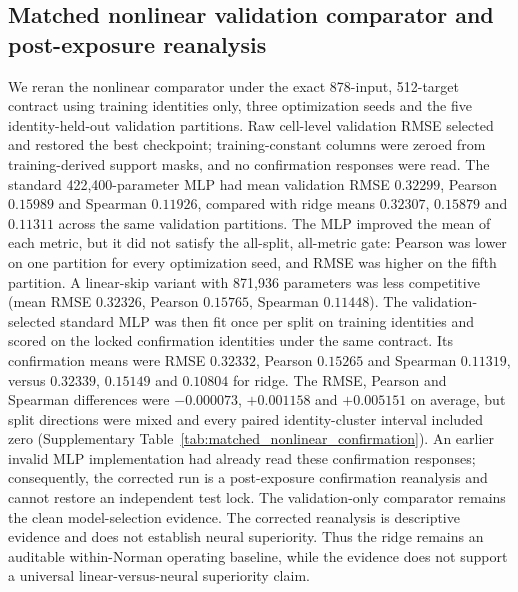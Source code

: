 \documentclass[10pt]{article}
\begin{document}



\subsection{Matched nonlinear validation comparator and post-exposure reanalysis}
We reran the nonlinear comparator under the exact 878-input, 512-target contract using training identities only, three optimization seeds and the five identity-held-out validation partitions. Raw cell-level validation RMSE selected and restored the best checkpoint; training-constant columns were zeroed from training-derived support masks, and no confirmation responses were read. The standard 422,400-parameter MLP had mean validation RMSE $0.32299$, Pearson $0.15989$ and Spearman $0.11926$, compared with ridge means $0.32307$, $0.15879$ and $0.11311$ across the same validation partitions. The MLP improved the mean of each metric, but it did not satisfy the all-split, all-metric gate: Pearson was lower on one partition for every optimization seed, and RMSE was higher on the fifth partition. A linear-skip variant with 871,936 parameters was less competitive (mean RMSE $0.32326$, Pearson $0.15765$, Spearman $0.11448$). The validation-selected standard MLP was then fit once per split on training identities and scored on the locked confirmation identities under the same contract. Its confirmation means were RMSE $0.32332$, Pearson $0.15265$ and Spearman $0.11319$, versus $0.32339$, $0.15149$ and $0.10804$ for ridge. The RMSE, Pearson and Spearman differences were $-0.000073$, $+0.001158$ and $+0.005151$ on average, but split directions were mixed and every paired identity-cluster interval included zero (Supplementary Table~\ref{tab:matched_nonlinear_confirmation}). An earlier invalid MLP implementation had already read these confirmation responses; consequently, the corrected run is a post-exposure confirmation reanalysis and cannot restore an independent test lock. The validation-only comparator remains the clean model-selection evidence. The corrected reanalysis is descriptive evidence and does not establish neural superiority. Thus the ridge remains an auditable within-Norman operating baseline, while the evidence does not support a universal linear-versus-neural superiority claim.
\end{document}
